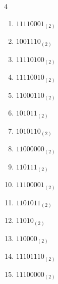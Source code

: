 \begin{multicols}{4}
\begin{enumerate}
        \phantom{$=171$}

  \item $11110001_{(2)}$

        \phantom{$=241$}

\columnbreak %

  \item $1001110_{(2)}$

        \phantom{$=78$}

  \item $11110100_{(2)}$

        \phantom{$=244$}

  \item $11110010_{(2)}$

        \phantom{$=242$}

  \item $11000110_{(2)}$

        \phantom{$=198$}

  \item $101011_{(2)}$

        \phantom{$=43$}

  \item $1010110_{(2)}$

        \phantom{$=86$}

  \item $11000000_{(2)}$

        \phantom{$=192$}

  \item $110111_{(2)}$

        \phantom{$=55$}

  \item $11100001_{(2)}$

        \phantom{$=225$}

  \item $1101011_{(2)}$

        \phantom{$=107$}

  \item $11010_{(2)}$

        \phantom{$=26$}

  \item $110000_{(2)}$

        \phantom{$=48$}

  \item $11101110_{(2)}$

        \phantom{$=238$}

  \item $11100000_{(2)}$


\end{enumerate}
\end{multicols}
